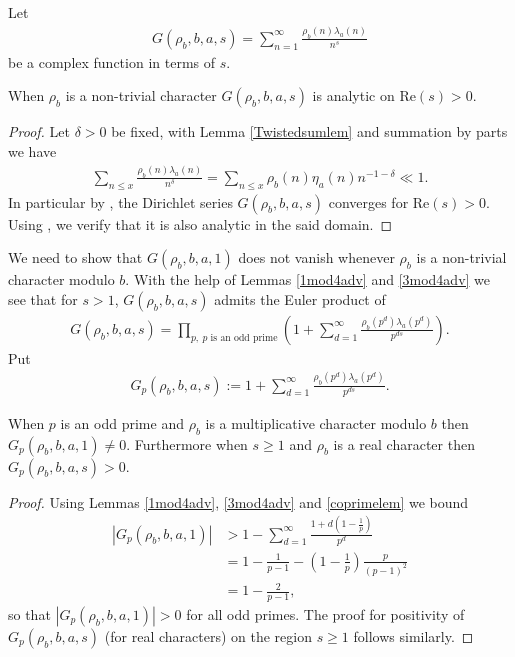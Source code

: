 \documentclass[12pt]{amsart}
\newcommand{\1}{\mathmybb{1}}
\begin{document}
Let 
\begin{align*}
G(\rho_{b},b,a,s) = \sum_{n=1}^{\infty}\frac{\rho_{b}(n)\lambda_{a}(n)}{n^{s}}
\end{align*}
be a complex function in terms of $s$.
\begin{cor}
\label{analytic}
When $\rho_{b}$ is a non-trivial character $G(\rho_{b},b,a,s)$ is analytic on $\text{Re}(s) > 0$.
\end{cor}
\begin{proof}
Let $\delta>0$ be fixed, with Lemma \ref{Twistedsumlem} and summation by parts we have
\begin{align*}
\sum_{n \leq x}\frac{\rho_{b}(n)\lambda_{a}(n)}{n^{\delta}} = \sum_{n \leq x}\rho_{b}(n)\eta_{a}(n)n^{-1-\delta} \ll 1.
\end{align*}
In particular by \cite[Theorem 11.8]{Apostol}, the Dirichlet series $G(\rho_{b},b,a,s)$ converges for $\text{Re}(s)>0$. Using \cite[Theorem 11.12]{Apostol}, we verify that it is also analytic in the said domain.
\end{proof}
We need to show that $G(\rho_{b},b,a,1)$ does not vanish whenever $\rho_{b}$ is a non-trivial character modulo $b$. With the help of Lemmas \ref{1mod4adv} and \ref{3mod4adv} we see that for $s>1$, $G(\rho_{b},b,a,s)$ admits the Euler product of
\begin{align}
\label{Geulerproduct}
G(\rho_{b},b,a,s) = \prod_{p, \ p \text{ is an odd prime}}\left(1+\sum_{d=1}^{\infty}\frac{\rho_{b}(p^{d})\lambda_{a}(p^d)}{p^{ds}}\right).
\end{align}
Put
\begin{align*}
G_{p}(\rho_{b},b,a,s) := 1+\sum_{d=1}^{\infty}\frac{\rho_{b}(p^{d})\lambda_{a}(p^d)}{p^{ds}}.
\end{align*}
\begin{lem}
\label{Gpnonvanishing}
When $p$ is an odd prime and $\rho_{b}$ is a multiplicative character modulo $b$ then $G_{p}(\rho_{b},b,a,1) \neq 0$. Furthermore when $s\geq 1$ and $\rho_{b}$ is a real character then $G_{p}(\rho_{b},b,a,s) > 0$.
\end{lem}
\begin{proof}
Using Lemmas \ref{1mod4adv}, \ref{3mod4adv} and \ref{coprimelem} we bound
\begin{align*}
|G_{p}(\rho_{b},b,a,1)| &> 1 -\sum_{d=1}^{\infty}\frac{1+d(1-\frac{1}{p})}{p^d}\\
&= 1- \frac{1}{p-1} - (1-\frac{1}{p})\frac{p}{(p-1)^2}\\
&= 1-\frac{2}{p-1},
\end{align*}
so that $|G_{p}(\rho_{b},b,a,1)|>0$ for all odd primes. The proof for positivity of $G_{p}(\rho_{b},b,a,s)$ (for real characters) on the region $s\geq 1$ follows similarly.
\end{proof}
\end{document}
